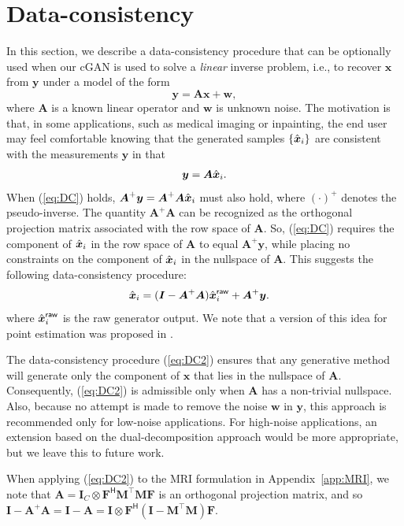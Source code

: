 \documentclass{article}
\theoremstyle{plain}
\theoremstyle{definition}
\theoremstyle{remark}
\newcommand{\hvec}[1]{\ensuremath{\Hat{\boldsymbol{#1}}}}
\renewcommand{\vec}[1]{\ensuremath{\boldsymbol{#1}}}
\newcommand{\tran}{^{\top}}
\newcommand{\herm}{^{\textsf{H}}}
\renewcommand{\eqref}[1]{(\ref{eq:#1})}
\newcommand{\appref}[1]{Appendix~\ref{app:#1}}
\newcommand{\raw}{^{\mathsf{raw}}}
\begin{document}
\section{Data-consistency} \label{app:consistency}
In this section, we describe a data-consistency procedure that can be optionally used when our cGAN is used to solve a \emph{linear} inverse problem, i.e., to recover $\vec{x}$ from $\vec{y}$ under a model of the form
\begin{equation}
\vec{y}
= \vec{Ax}+\vec{w}
\label{eq:y} ,
\end{equation}
where $\vec{A}$ is a known linear operator and $\vec{w}$ is unknown noise.
The motivation is that, in some applications, such as medical imaging or inpainting, the end user may feel comfortable knowing that the generated samples $\{\hvec{x}_i\}$ are consistent with the measurements $\vec{y}$ in that 
\begin{align}
\vec{y}=\vec{A}\hvec{x}_i
\label{eq:DC}.
\end{align}
When \eqref{DC} holds, $\vec{A}^+\vec{y}=\vec{A}^+\vec{A}\hvec{x}_i$ must also hold, where $(\cdot)^+$ denotes the pseudo-inverse.
The quantity $\vec{A}^+\vec{A}$ can be recognized as the orthogonal projection matrix associated with the row space of $\vec{A}$.
So, \eqref{DC} requires the component of $\hvec{x}_i$ in the row space of $\vec{A}$ to equal $\vec{A}^+\vec{y}$, while placing no constraints on the component of $\hvec{x}_i$ in the nullspace of $\vec{A}$.
This suggests the following data-consistency procedure:
\begin{align}
\hvec{x}_i
&= (\vec{I}-\vec{A}^+\vec{A})\hvec{x}_i\raw + \vec{A}^+\vec{y}
\label{eq:DC2}.
\end{align}
where $\hvec{x}_i\raw$ is the raw generator output. 
We note that a version of this idea for point estimation was proposed in \cite{Sonderby:ICLR:17}.

The data-consistency procedure \eqref{DC2} ensures that any generative method will generate only the component of $\vec{x}$ that lies in the nullspace of $\vec{A}$. 
Consequently, \eqref{DC2} is admissible only when $\vec{A}$ has a non-trivial nullspace.
Also, because no attempt is made to remove the noise $\vec{w}$ in $\vec{y}$, this approach is recommended only for low-noise applications.
For high-noise applications, an extension based on the dual-decomposition approach \cite{Chen:ECCV:20} would be more appropriate, but we leave this to future work.

When applying \eqref{DC2} to the MRI formulation in \appref{MRI}, we note that $\vec{A}=\vec{I}_C \otimes \vec{F}\herm\vec{M}\tran\vec{MF}$ is an orthogonal projection matrix, and so $\vec{I}-\vec{A}^+\vec{A} = \vec{I}-\vec{A} = \vec{I}\otimes \vec{F}\herm(\vec{I}-\vec{M}\tran\vec{M})\vec{F}$.
\end{document}
